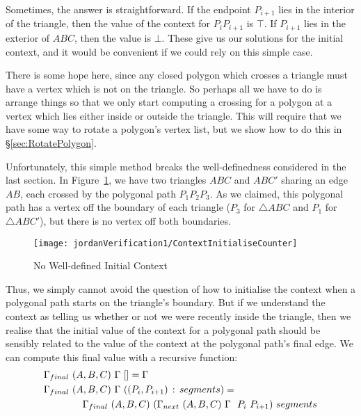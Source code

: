Sometimes, the answer is straightforward. If the endpoint $P_{i+1}$ lies in the interior of the triangle, then the value of the context for $P_iP_{i+1}$ is $\top$. If $P_{i+1}$ lies in the exterior of $ABC$, then the value is $\bot$. These give us our solutions for the initial context, and it would be convenient if we could rely on this simple case.

There is some hope here, since any closed polygon which crosses a triangle must have a vertex which is not on the triangle. So perhaps all we have to do is arrange things so that we only start computing a crossing for a polygon at a vertex which lies either inside or outside the triangle. This will require that we have some way to rotate a polygon's vertex list, but we show how to do this in \S\ref{sec:RotatePolygon}.

Unfortunately, this simple method breaks the well-definedness considered in the last section. In Figure~\ref{fig:ContextInitialiseCounter}, we have two triangles $ABC$ and $ABC'$ sharing an edge $AB$, each crossed by the polygonal path $P_1P_2P_3$. As we claimed, this polygonal path has a vertex off the boundary of each triangle ($P_3$ for $\triangle ABC$ and $P_1$ for $\triangle ABC'$), but there is no vertex off both boundaries. 

\begin{figure}
\centering\texttt{[image: jordanVerification1/ContextInitialiseCounter]}
\caption{No Well-defined Initial Context}\label{fig:ContextInitialiseCounter}
\end{figure}

Thus, we simply cannot avoid the question of how to initialise the context when a polygonal path starts on the triangle's boundary. But if we understand the context as telling us whether or not we were recently inside the triangle, then we realise that the initial value of the context for a polygonal path should be sensibly related to the value of the context at the polygonal path's final edge. We can compute this final value with a recursive function:
\begin{equation}
\begin{aligned}
&\Gamma_{final}\ (A,B,C)\ \Gamma\ [] = \Gamma\\
&\Gamma_{final}\ (A,B,C)\ \Gamma\ ((P_i,P_{i+1})\,:\,segments) = \\
&\qquad\qquad\Gamma_{final}\ (A,B,C)\ (\Gamma_{next}\ (A,B,C)\ \Gamma\ \ P_i\ P_{i+1})\ segments
\end{aligned}
\end{equation}

